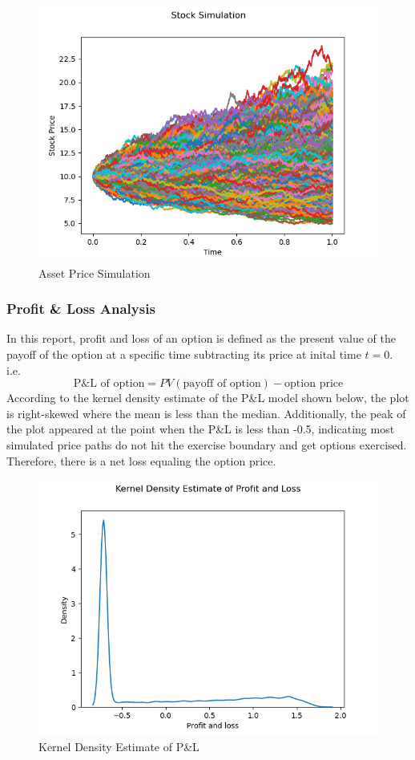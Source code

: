 \documentclass[12pt]{article}
\begin{document}
\begin{figure}[H]
  \centering
  \includegraphics[scale=0.49]{3b-i-simulation.png}
  \caption[Asset Price Simulation]{Asset Price Simulation}
\end{figure}

\subsubsection{Profit \& Loss Analysis}
In this report, profit and loss of an option is defined as the present value of the payoff of the option at a specific time subtracting its price at inital time $t=0$. 
\\i.e.
\[\text{P\&L of option} = PV(\text{payoff of option}) - \text{option price}\]
According to the kernel density estimate of the P\&L model shown below, the plot is right-skewed where the mean is less than the median. Additionally, the peak of the plot appeared at the point when the 
P\&L is less than -0.5, indicating most simulated price paths do not hit the exercise boundary and get options exercised. Therefore, there is a net loss equaling the option price.
\begin{figure}[H]
  \centering
    \includegraphics[scale=0.63]{3b-i-P&L.png}
    \caption[Kernel Density Estimate of P\&L]{Kernel Density Estimate of P\&L}
\end{figure}
\end{document}
